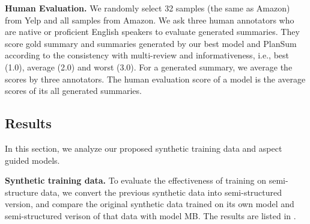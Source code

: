 \textbf{Human Evaluation.}
We randomly select 32 samples (the same as Amazon) from Yelp and all samples from Amazon.
We ask three human annotators
who are 
native or proficient English speakers to evaluate generated summaries.
They score gold summary and summaries 
generated by our best model and 
PlanSum according to the consistency with multi-review and informativeness,
i.e., best (1.0), average (2.0) and worst (3.0).
For a generated summary, we average the scores by
three annotators.
The human evaluation score of a model is the average scores of its all generated summaries.


\subsection{Results}
\label{sec:results}
In this section, we analyze our proposed synthetic training data  and 
aspect guided models.


\textbf{Synthetic training data.}
To evaluate the effectiveness of training on semi-structure data,
we convert the previous synthetic data into semi-structured version,
and compare the original synthetic data trained on its own model and
semi-structured verison of that data with model MB.
The results are listed in .

